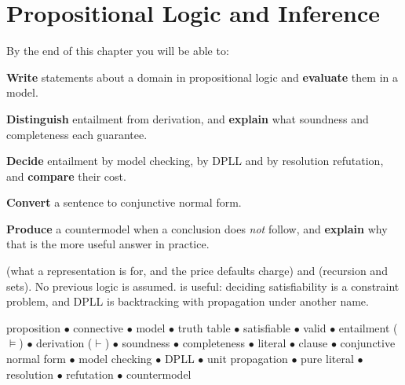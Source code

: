 \chapter{Propositional Logic and Inference}\label{ch:propositional}

\begin{outcomes}
By the end of this chapter you will be able to:
\begin{tight}
  \item \textbf{Write} statements about a domain in propositional logic and
        \textbf{evaluate} them in a model.
  \item \textbf{Distinguish} entailment from derivation, and \textbf{explain} what
        soundness and completeness each guarantee.
  \item \textbf{Decide} entailment by model checking, by DPLL and by resolution
        refutation, and \textbf{compare} their cost.
  \item \textbf{Convert} a sentence to conjunctive normal form.
  \item \textbf{Produce} a countermodel when a conclusion does \emph{not} follow,
        and \textbf{explain} why that is the more useful answer in practice.
\end{tight}
\end{outcomes}

\begin{prereq}
 (what a representation is for, and the price defaults charge) and
 (recursion and sets). No previous logic is assumed.  is
useful: deciding satisfiability is a constraint problem, and DPLL is backtracking
with propagation under another name.
\end{prereq}

\begin{keyterms}
proposition $\bullet$ connective $\bullet$ model $\bullet$ truth table $\bullet$
satisfiable $\bullet$ valid $\bullet$ entailment ($\models$) $\bullet$ derivation
($\vdash$) $\bullet$ soundness $\bullet$ completeness $\bullet$ literal $\bullet$
clause $\bullet$ conjunctive normal form $\bullet$ model checking $\bullet$ DPLL
$\bullet$ unit propagation $\bullet$ pure literal $\bullet$ resolution $\bullet$
refutation $\bullet$ countermodel
\end{keyterms}

